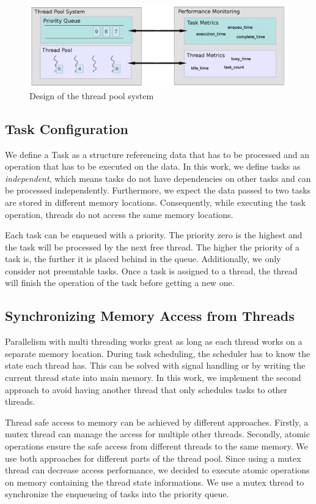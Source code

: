 \documentclass[conference]{IEEEtran}
\begin{document}
\begin{figure}[htbp]
	\includegraphics[width=1.0\textwidth]{img/pool_structure.png}
	\caption{Design of the thread pool system}
	\label{fig0}
\end{figure}

\subsection{Task Configuration}
We define a Task as a structure referencing data that has to be processed and an operation that has to be executed on the data. In this work, we define tasks as \emph{independent}, which means tasks do not have dependencies on other tasks and can be processed independently. Furthermore, we expect the data passed to two tasks are stored in different memory locations. Consequently, while executing the task operation, threads do not access the same memory locations.

Each task can be enqueued with a priority. The priority zero is the highest and the task will be processed by the next free thread. The higher the priority of a task is, the further it is placed behind in the queue. Additionally, we only consider not preemtable tasks. Once a task is assigned to a thread, the thread will finish the operation of the task before getting a new one.

\subsection{Synchronizing Memory Access from Threads}
Parallelism with multi threading works great as long as each thread works on a separate memory location. During task scheduling, the scheduler has to know the state each thread has. This can be solved with signal handling or by writing the current thread state into main memory. In this work, we implement the second approach to avoid having another thread that only schedules tasks to other threads.

Thread safe access to memory can be achieved by different approaches. Firstly, a mutex thread can manage the access for multiple other threads. Secondly, atomic operations ensure the safe access from different threads to the same memory. We use both approaches for different parts of the thread pool. Since using a mutex thread can decrease access performance, we decided to execute atomic operations on memory containing the thread state informations. We use a mutex thread to synchronize the enqueueing of tasks into the priority queue.
\end{document}
